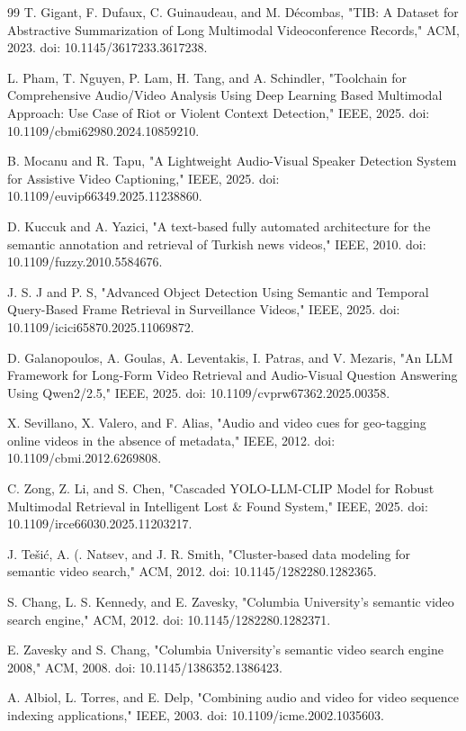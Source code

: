 \documentclass[conference]{IEEEtran}
\begin{document}
\begin{thebibliography}{99}
T. Gigant, F. Dufaux, C. Guinaudeau, and M. Décombas, "TIB: A Dataset for Abstractive Summarization of Long Multimodal Videoconference Records," ACM, 2023. doi: 10.1145/3617233.3617238.

L. Pham, T. Nguyen, P. Lam, H. Tang, and A. Schindler, "Toolchain for Comprehensive Audio/Video Analysis Using Deep Learning Based Multimodal Approach: Use Case of Riot or Violent Context Detection," IEEE, 2025. doi: 10.1109/cbmi62980.2024.10859210.

B. Mocanu and R. Tapu, "A Lightweight Audio-Visual Speaker Detection System for Assistive Video Captioning," IEEE, 2025. doi: 10.1109/euvip66349.2025.11238860.

D. Kuccuk and A. Yazici, "A text-based fully automated architecture for the semantic annotation and retrieval of Turkish news videos," IEEE, 2010. doi: 10.1109/fuzzy.2010.5584676.

J. S. J and P. S, "Advanced Object Detection Using Semantic and Temporal Query-Based Frame Retrieval in Surveillance Videos," IEEE, 2025. doi: 10.1109/icici65870.2025.11069872.

D. Galanopoulos, A. Goulas, A. Leventakis, I. Patras, and V. Mezaris, "An LLM Framework for Long-Form Video Retrieval and Audio-Visual Question Answering Using Qwen2/2.5," IEEE, 2025. doi: 10.1109/cvprw67362.2025.00358.

X. Sevillano, X. Valero, and F. Alias, "Audio and video cues for geo-tagging online videos in the absence of metadata," IEEE, 2012. doi: 10.1109/cbmi.2012.6269808.

C. Zong, Z. Li, and S. Chen, "Cascaded YOLO-LLM-CLIP Model for Robust Multimodal Retrieval in Intelligent Lost \& Found System," IEEE, 2025. doi: 10.1109/irce66030.2025.11203217.

J. Tešić, A. (. Natsev, and J. R. Smith, "Cluster-based data modeling for semantic video search," ACM, 2012. doi: 10.1145/1282280.1282365.

S. Chang, L. S. Kennedy, and E. Zavesky, "Columbia University's semantic video search engine," ACM, 2012. doi: 10.1145/1282280.1282371.

E. Zavesky and S. Chang, "Columbia University's semantic video search engine 2008," ACM, 2008. doi: 10.1145/1386352.1386423.

A. Albiol, L. Torres, and E. Delp, "Combining audio and video for video sequence indexing applications," IEEE, 2003. doi: 10.1109/icme.2002.1035603.


\end{thebibliography}
\end{document}
